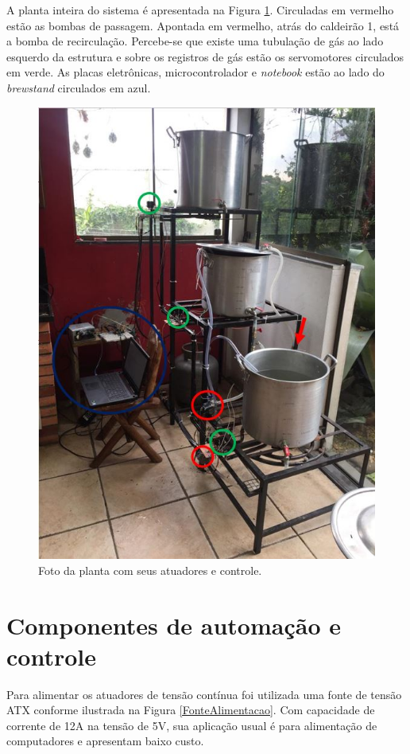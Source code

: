 A planta inteira do sistema é apresentada na Figura \ref{plantaPronta}. Circuladas em vermelho estão as bombas de passagem. Apontada em vermelho, atrás do caldeirão 1, está a bomba de recirculação. Percebe-se que existe uma tubulação de gás ao lado esquerdo da estrutura e sobre os registros de gás estão os servomotores circulados em verde. As placas eletrônicas, microcontrolador e \textit{notebook} estão ao lado do \textit{brewstand} circulados em azul. 
\begin{figure}[htb]
	\caption{\label{plantaPronta}Foto da planta com seus atuadores e controle.}
	\begin{center}
	    \includegraphics[width=0.85\linewidth]{./img/sistemaInteiro02.jpg}
	\end{center}
\end{figure}

		\section{Componentes de automação e controle}
Para alimentar os atuadores de tensão contínua foi utilizada uma fonte de tensão ATX conforme ilustrada na Figura \ref{FonteAlimentacao}. Com capacidade de corrente de 12A na tensão de 5V, sua aplicação usual é para alimentação de computadores e apresentam baixo custo.

